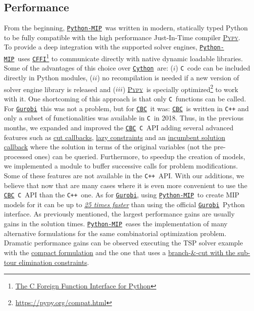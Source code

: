 \documentclass{article}
\def\C{\texttt{C}}
\def\CPP{\texttt{C++}}
\def\Pypy{\href{https://pypy.org}{\textsc{Pypy}}}
\def\Gurobi{\href{www.gurobi.com}{\texttt{Gurobi}\textsuperscript{\textregistered}}}
\def\Cython{\href{https://cython.org/}{\texttt{Cython}}}
\def\CFFI{\href{https://cffi.readthedocs.io}{\texttt{CFFI}}}
\def\CBC{\href{https://github.com/coin-or/cbc}{\texttt{CBC}}}
\def\PythonMIP{\href{https://github.com/coin-or/python-mip}{\texttt{Python-MIP}}}
\begin{document}
\subsection{Performance}
From the beginning, \PythonMIP\ was written in modern, statically typed Python to be fully compatible with the high performance Just-In-Time compiler \Pypy. To provide a deep integration with the supported solver engines, \PythonMIP\ uses \CFFI\footnote{\href{https://cffi.readthedocs.io}{The C Foreign Function Interface for Python}} to communicate directly with native dynamic loadable libraries. Some of the advantages of this choice over \Cython\ are: ($i$) \C\ code can be included directly in Python modules, ($ii$) no recompilation is needed if a new version of solver engine library is released and ($iii$) \Pypy\ is specially optimized\footnote{\href{https://pypy.org/compat.html}{https://pypy.org/compat.html}} to work with it. One shortcoming of this approach is that only \C\ functions can be called. For \Gurobi\ this was not a problem, but for \CBC\ it was: \CBC\ is written in \texttt{C++} and only a subset of functionalities was available in \C\ in 2018. Thus, in the previous months, we expanded and improved the \CBC\ \C\ API adding several advanced features such as \href{https://python-mip.readthedocs.io/en/latest/custom.html#cut-callback}{cut callbacks}, \href{https://python-mip.readthedocs.io/en/latest/custom.html#lazy-constraints}{lazy constraints} and an \href{https://python-mip.readthedocs.io/en/latest/classes.html#incumbentupdater}{incumbent solution callback} where the solution in terms of the original variables (not the pre-processed ones) can be queried. Furthermore, to speedup the creation of models, we implemented a module to buffer successive calls for problem modifications. Some of these features are not available in the \CPP\ API. With our additions, we believe that now that are many cases where it is even more convenient to use the \CBC\ \C\ API than the \CPP\ one. As for \Gurobi, using \PythonMIP\ to create MIP models for it can be up to \href{https://python-mip.readthedocs.io/en/latest/bench.html#n-queens}{ \emph{25 times faster}} than using the official \Gurobi\ Python interface. As previously mentioned, the largest performance gains are usually gains in the solution times. \PythonMIP\ eases the implementation of many alternative formulations for the same combinatorial optimization problem. Dramatic performance gains can be observed executing the TSP solver example with the \href{https://github.com/coin-or/python-mip/blob/master/examples/tsp-compact.py}{compact formulation} and the one that uses a \href{https://github.com/coin-or/python-mip/blob/master/examples/tsp-cuts.py}{
branch-\&-cut with the sub-tour elimination constraints}.
\end{document}
